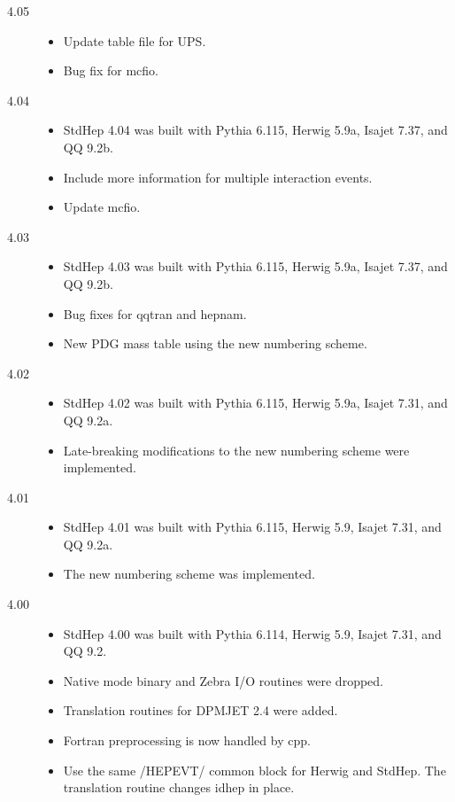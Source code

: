 \begin{description}
\item[4.05]

\begin{itemize}
\item Update table file for UPS.
\item Bug fix for mcfio.
\end{itemize}

\item[4.04]

\begin{itemize}
\item StdHep 4.04 was built with Pythia 6.115, Herwig 5.9a, Isajet 7.37, and QQ 9.2b.
\item Include more information for multiple interaction events.
\item Update mcfio.
\end{itemize}

\item[4.03]

\begin{itemize}
\item StdHep 4.03 was built with Pythia 6.115, Herwig 5.9a, Isajet 7.37, and QQ 9.2b.
\item Bug fixes for qqtran and hepnam.
\item New PDG mass table using the new numbering scheme.
\end{itemize}

\item[4.02]

\begin{itemize}
\item StdHep 4.02 was built with Pythia 6.115, Herwig 5.9a, Isajet 7.31, and QQ 9.2a.
\item Late-breaking modifications to the new numbering scheme were implemented.
\end{itemize}

\item[4.01]

\begin{itemize}
\item StdHep 4.01 was built with Pythia 6.115, Herwig 5.9, Isajet 7.31, and QQ 9.2a.
\item The new numbering scheme was implemented.
\end{itemize}

\item[4.00]

\begin{itemize}
\item StdHep 4.00 was built with Pythia 6.114, Herwig 5.9, Isajet 7.31, and QQ 9.2.
\item Native mode binary and Zebra I/O routines were dropped.
\item Translation routines for DPMJET 2.4 were added.
\item Fortran preprocessing is now handled by cpp.
\item Use the same /HEPEVT/ common block for Herwig and StdHep.
      The translation routine changes idhep in place.
\end{itemize}


\end{description}
